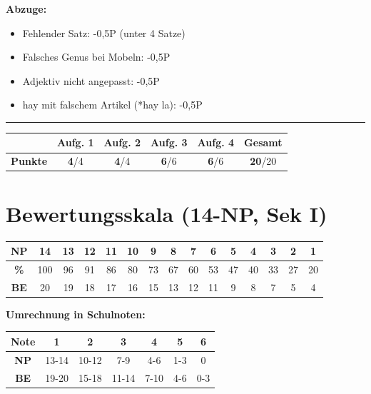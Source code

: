 \documentclass[11pt, a4paper]{article}
\newcommand{\maxpunkte}{20}
\newcommand{\loesung}[1]{\textcolor{loesung}{\textbf{#1}}}
\begin{document}
\vspace{1em}

\textbf{Abzuge:}
\begin{itemize}
    \item Fehlender Satz: -0,5P (unter 4 Satze)
    \item Falsches Genus bei Mobeln: -0,5P
    \item Adjektiv nicht angepasst: -0,5P
    \item hay mit falschem Artikel (*hay la): -0,5P
\end{itemize}


\vspace{20pt}
\hrule
\vspace{10pt}

\noindent
\begin{tabularx}{\textwidth}{|X|c|c|c|c||c|}
\hline
& \textbf{Aufg. 1} & \textbf{Aufg. 2} & \textbf{Aufg. 3} & \textbf{Aufg. 4} & \textbf{Gesamt} \\
\hline
\textbf{Punkte} & \loesung{4}/4 & \loesung{4}/4 & \loesung{6}/6 & \loesung{6}/6 & \loesung{20}/\maxpunkte \\
\hline
\end{tabularx}

\vspace{15pt}


\section*{Bewertungsskala (14-NP, Sek I)}

\begin{center}
\begin{tabular}{|c|c|c|c|c|c|c|c|c|c|c|c|c|c|c|}
\hline
\textbf{NP} & 14 & 13 & 12 & 11 & 10 & 9 & 8 & 7 & 6 & 5 & 4 & 3 & 2 & 1 \\
\hline
\textbf{\%} & 100 & 96 & 91 & 86 & 80 & 73 & 67 & 60 & 53 & 47 & 40 & 33 & 27 & 20 \\
\hline
\textbf{BE} & 20 & 19 & 18 & 17 & 16 & 15 & 13 & 12 & 11 & 9 & 8 & 7 & 5 & 4 \\
\hline
\end{tabular}
\end{center}

\vspace{0.5em}

\textbf{Umrechnung in Schulnoten:}
\begin{center}
\begin{tabular}{|c|c|c|c|c|c|c|}
\hline
\textbf{Note} & 1 & 2 & 3 & 4 & 5 & 6 \\
\hline
\textbf{NP} & 13-14 & 10-12 & 7-9 & 4-6 & 1-3 & 0 \\
\hline
\textbf{BE} & 19-20 & 15-18 & 11-14 & 7-10 & 4-6 & 0-3 \\
\hline
\end{tabular}
\end{center}
\end{document}
